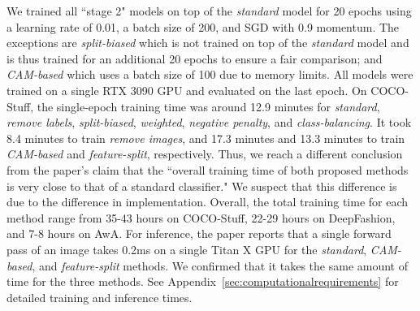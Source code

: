 We trained all ``stage 2" models on top of the \emph{standard} model for 20 epochs using a learning rate of 0.01, a batch size of 200, and SGD with 0.9 momentum. The exceptions are \emph{split-biased} which is not trained on top of the \emph{standard} model and is thus trained for an additional 20 epochs to ensure a fair comparison; and \emph{CAM-based} which uses a batch size of 100 due to memory limits. All models were trained on a single RTX 3090 GPU and evaluated on the last epoch. On COCO-Stuff, the single-epoch training time was around 12.9 minutes for \emph{standard}, \emph{remove labels}, \emph{split-biased}, \emph{weighted}, \emph{negative penalty}, and \emph{class-balancing}. It took 8.4 minutes to train \emph{remove images}, and 17.3 minutes and 13.3 minutes to train \emph{CAM-based} and \emph{feature-split}, respectively. Thus, we reach a different conclusion from the paper's claim that the ``overall training time of both proposed methods is very close to that of a standard classifier." We suspect that this difference is due to the difference in implementation. Overall, the total training time for each method range from 35-43 hours on COCO-Stuff, 22-29 hours on DeepFashion, and 7-8 hours on AwA. For inference, the paper reports that a single forward pass of an image takes 0.2ms on a single Titan X GPU for the \emph{standard}, \emph{CAM-based}, and \emph{feature-split} methods. We confirmed that it takes the same amount of time for the three methods. See Appendix~\ref{sec:computationalrequirements} for detailed training and inference times.


